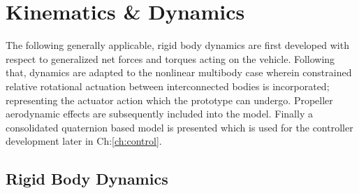 \chapter{Kinematics \& Dynamics}
\label{ch:dynamics}
The following generally applicable, rigid body dynamics are first developed with respect to generalized net forces and torques acting on the vehicle. Following that, dynamics are adapted to the nonlinear multibody case wherein constrained relative rotational actuation between interconnected bodies is incorporated; representing the actuator action which the prototype can undergo. Propeller aerodynamic effects are subsequently included into the model. Finally a consolidated quaternion based model is presented which is used for the controller development later in Ch:\ref{ch:control}.
\section{Rigid Body Dynamics}
\label{sec:dynamics.rigidbody}
